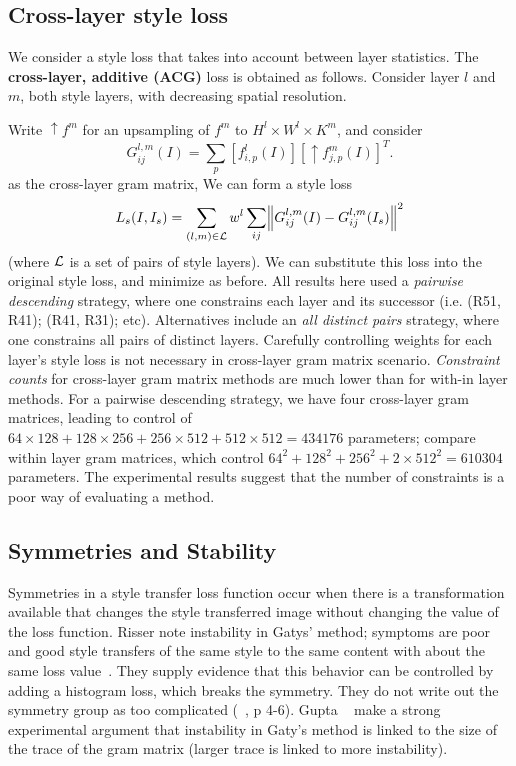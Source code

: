 \documentclass[runningheads]{llncs}
\begin{document}
\subsection{Cross-layer style loss}
We consider a style loss that takes into account between layer statistics.  The {\bf cross-layer, additive (ACG)} loss
is obtained as follows.  Consider layer $l$ and $m$, both style layers, with decreasing 
spatial resolution.  

Write $\uparrow f^{m}$ for an upsampling of  $f^m$ to $H^l\times W^l \times K^m$, and consider
\[
G_{ij}^{l,m}(I) = \sum_{p} \left[ f_{i,p}^l(I)\right]\left[\uparrow {f}_{j,p}^{m}(I)\right]^{T}.
\]
as the cross-layer gram matrix, We can form a style loss
\[
L_s(I, I_{s}) = \sum_{(l, m)\in {\cal L}} w^{l}\sum_{ij} \norm{G^{l,m}_{ij}(I)-G^{l,m}_{ij}(I_s)}^2
\]
(where ${\cal L}$ is a set of pairs of style layers).   We can substitute this loss into the original style loss, and
minimize as before.  All results here used a {\em pairwise descending} strategy, where one constrains each layer and its
successor (i.e. (R51, R41); (R41, R31); etc).  Alternatives include an {\em all distinct pairs} strategy, where one constrains all pairs of distinct
layers. Carefully controlling weights for each layer's style loss is not necessary in cross-layer gram matrix scenario.  
{\em Constraint counts} for cross-layer gram matrix methods are much lower than for with-in layer methods.  For a
pairwise descending strategy,  we have four cross-layer gram matrices, leading to  control of $64\times
128+128\times 256+256\times 512+512\times 512 = 434176 $ parameters; compare within layer gram matrices, which control 
$64^2+128^2+256^2+2\times512^2 = 610304$ parameters.  The experimental results suggest that the number of constraints is a poor way of evaluating a method.

\vspace{-2mm}
\subsection{Symmetries and Stability}\label{sec:symmetry}
 
Symmetries in a style transfer loss function occur when there is a transformation available that changes the style
transferred image without changing the value of the loss function.   Risser \ea note instability in Gatys' method;
symptoms are poor and good style transfers of the same style to the same content with about the same loss value~\cite{risser2017stable}.
They supply evidence that this behavior can be controlled by adding a histogram loss, which breaks the symmetry.
They do not write out the symmetry group as too complicated
(~\cite{risser2017stable}, p 4-6).   Gupta \ea ~\cite{gupta2017characterizing} make a strong experimental argument that instability in Gaty's method is linked to the size of the trace of the gram matrix (larger trace is linked to more instability).
\end{document}
